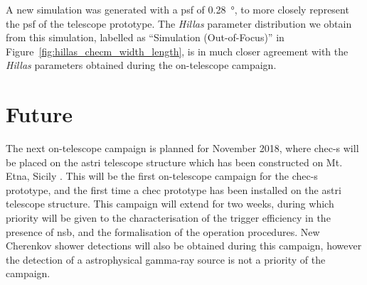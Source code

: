 A new simulation was generated with a \gls{psf} of \SI{0.28}{\degree}, to more closely represent the \gls{psf} of the telescope prototype. The \textit{Hillas} parameter distribution we obtain from this simulation, labelled as ``Simulation (Out-of-Focus)'' in Figure~\ref{fig:hillas_checm_width_length}, is in much closer agreement with the \textit{Hillas} parameters obtained during the on-telescope campaign. 

\section{Future}

The next on-telescope campaign is planned for November 2018, where \gls{chec-s} will be placed on the \gls{astri} telescope structure which has been constructed on Mt. Etna, Sicily \cite{Maccarone2017}. This will be the first on-telescope campaign for the \gls{chec-s} prototype, and the first time a \gls{chec} prototype has been installed on the \gls{astri} telescope structure. This campaign will extend for two weeks, during which priority will be given to the characterisation of the trigger efficiency in the presence of \gls{nsb}, and the formalisation of the operation procedures. New Cherenkov shower detections will also be obtained during this campaign, however the detection of a astrophysical gamma-ray source is not a priority of the campaign.
